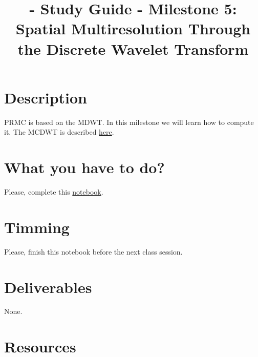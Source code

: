 
\title{\SM - Study Guide - Milestone 5: Spatial Multiresolution Through the Discrete Wavelet Transform}

\maketitle

\section{Description}

PRMC is based on the MDWT. In this milestone we will learn how to
compute it. The MCDWT is described
\href{https://sistemas-multimedia.github.io/PRMC/#x1-100005}{here}.

\section{What you have to do?}
  
Please, complete this
\href{https://github.com/Sistemas-Multimedia/Sistemas-Multimedia.github.io/blob/master/study_guide/MDWT/MDWT.ipynb}{notebook}.

\section{Timming}

Please, finish this notebook before the next class session.

\section{Deliverables}

None.

\section{Resources}


